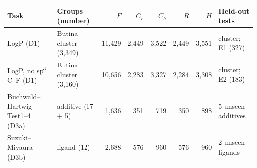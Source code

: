 \begin{tabular}{@{}llrrrrrl@{}}
\toprule
Task & Groups (number) & $F$ & $C_r$ & $C_h$ & $R$ & $H$ & Held-out tests \\
\midrule
LogP (D1) & Butina cluster (3,349) & 11,429 & 2,449 & 3,522 & 2,449 & 3,551 & cluster; E1 (327) \\
LogP, no sp\textsuperscript{3} C--F (D1) & Butina cluster (3,160) & 10,656 & 2,283 & 3,327 & 2,284 & 3,308 & cluster; E2 (183) \\
Buchwald--Hartwig Test1--4 (D3a) & additive (17 + 5) & 1,636 & 351 & 719 & 350 & 898 & 5 unseen additives \\
Suzuki--Miyaura (D3b) & ligand (12) & 2,688 & 576 & 960 & 576 & 960 & 2 unseen ligands \\
\bottomrule
\end{tabular}
